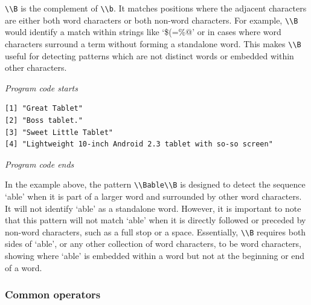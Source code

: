 \texttt{\textbackslash{}\textbackslash{}B} is the complement of
\texttt{\textbackslash{}\textbackslash{}b}. It matches positions where
the adjacent characters are either both word characters or both non-word
characters. For example, \texttt{\textbackslash{}\textbackslash{}B}
would identify a match within strings like `\$(=\%@' or in cases where word
characters surround a term without forming a standalone word. This makes
\texttt{\textbackslash{}\textbackslash{}B} useful for detecting patterns
which are not distinct words or embedded within other characters.

\emph{Program code starts}

\begin{Shaded}
\begin{Highlighting}[]
\NormalTok{(}\SpecialCharTok{\textbackslash{}\textbackslash{}}\SpecialCharTok{\textbackslash{}\textbackslash{}} \NormalTok{)}
\end{Highlighting}
\end{Shaded}

\begin{verbatim}
[1] "Great Tablet"                                            
[2] "Boss tablet."                                            
[3] "Sweet Little Tablet"                                     
[4] "Lightweight 10-inch Android 2.3 tablet with so-so screen"
\end{verbatim}

\emph{Program code ends}

In the example above, the pattern
\texttt{\textbackslash{}\textbackslash{}Bable\textbackslash{}\textbackslash{}B}
is designed to detect the sequence `able' when it is part of a larger
word and surrounded by other word characters. It will not identify `able'
as a standalone word. However, it is important to note that this pattern will not match `able' when it is directly followed or preceded by
non-word characters, such as a full stop or a space. Essentially,
\texttt{\textbackslash{}\textbackslash{}B} requires both sides of
`able', or any other collection of word characters, to be word characters, showing where `able' is embedded
within a word but not at the beginning or end of a word.

\subsubsection{Common operators}\label{common-operators}

